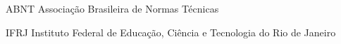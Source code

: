 %
%
\begin{siglas}
    \item[ABNT] Associação Brasileira de Normas Técnicas
    \item[IFRJ] Instituto Federal de Educação, Ciência e Tecnologia do Rio de Janeiro
\end{siglas}
